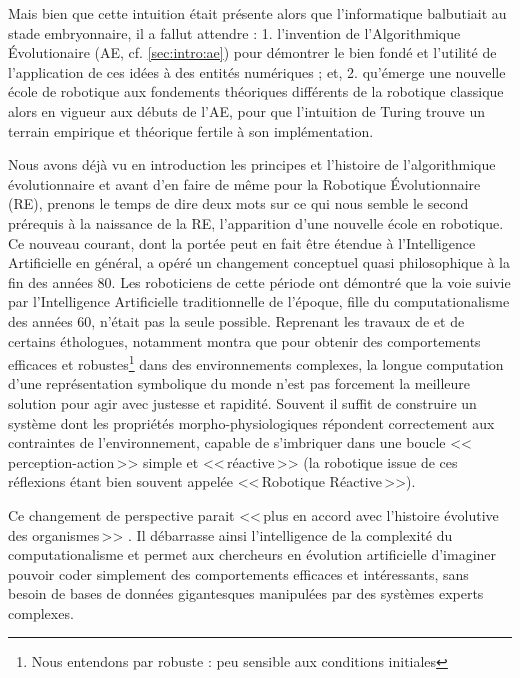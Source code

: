 Mais bien que cette intuition était présente alors que l'informatique balbutiait au stade embryonnaire, il a fallut attendre : 1. l'invention de l'Algorithmique \'Evolutionaire (AE, cf. \ref{sec:intro:ae}) pour démontrer le bien fondé et l'utilité de l'application de ces idées à des entités numériques ; et, 2. qu'émerge une nouvelle école de robotique aux fondements théoriques différents de la robotique classique alors en vigueur aux débuts de l'AE, pour que l'intuition de Turing trouve un terrain empirique et théorique fertile à son implémentation.

Nous avons déjà vu en introduction les principes et l'histoire de l'algorithmique évolutionnaire et avant d'en faire de même pour la Robotique \'Evolutionnaire (RE), prenons le temps de dire deux mots sur ce qui nous semble le second prérequis à la naissance de la RE, l'apparition d'une nouvelle école en robotique.
Ce nouveau courant, dont la portée peut en fait être étendue à l'Intelligence Artificielle en général, a opéré un changement conceptuel quasi philosophique à la fin des années 80. Les roboticiens de cette période ont démontré que la voie suivie par l'Intelligence Artificielle traditionnelle de l'époque, fille du computationalisme des années 60, n'était pas la seule possible. Reprenant les travaux de \citet{braintenberg86vehicles} et de certains éthologues, \cite{brooks91intelligencewithoutreason} notamment montra que pour obtenir des comportements efficaces et robustes\footnote{Nous entendons par robuste : peu sensible aux conditions initiales} dans des environnements complexes, la longue computation d'une représentation symbolique du monde n'est pas forcement la meilleure solution pour agir avec justesse et rapidité. Souvent il suffit de construire un système dont les propriétés morpho-physiologiques répondent correctement aux contraintes de l'environnement, capable de s'imbriquer dans une boucle <<\,perception-action\,>> simple et <<\,réactive\,>> (la robotique issue de ces réflexions étant bien souvent appelée <<\,Robotique Réactive\,>>).

Ce changement de perspective parait <<\,plus en accord avec l'histoire évolutive des organismes\,>> \citep[Brooks dans la préface de ][p. 15]{pfeifer2006howthebodyshapesthewaywethink}. Il débarrasse ainsi l'intelligence de la complexité du computationalisme et permet aux chercheurs en évolution artificielle d'imaginer pouvoir coder simplement des comportements efficaces et intéressants, sans besoin de bases de données gigantesques manipulées par des systèmes experts complexes.

